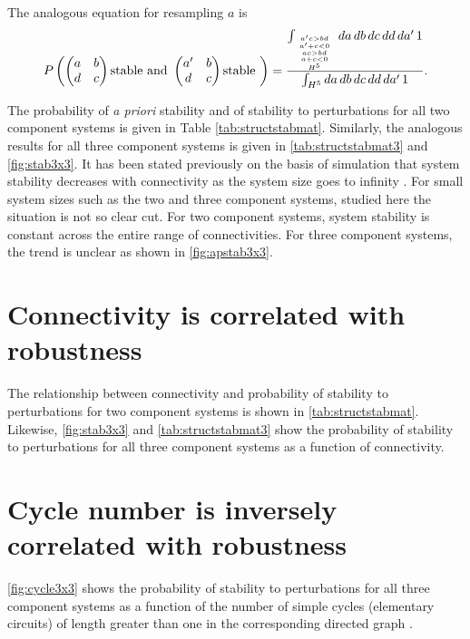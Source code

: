 The analogous equation for resampling $a$ is
\begin{align*}
P\left(\begin{pmatrix}
a & b \\
d & c
\end{pmatrix} \textrm{stable and } \begin{pmatrix}
a' & b \\
d & c
\end{pmatrix} \textrm{stable } \right) = \frac{\int_{{{{a'c>bd \atop a' + c < 0} \atop ac>bd} \atop a+c<0} \atop H^5} da\,db\,dc\,dd\,da'\,1}{\int_{H^5} da\,db\,dc\,dd\,da'\,1}.
\end{align*}

The probability of \emph{a priori} stability and of stability to perturbations for all two component systems is given in Table \ref{tab:structstabmat}. Similarly, the analogous results for all three component systems is given in \ref{tab:structstabmat3} and \ref{fig:stab3x3}. It has been stated previously on the basis of simulation that system stability decreases with connectivity as the system size goes to infinity \cite{May1972}. For small system sizes such as the two and three component systems, studied here the situation is not so clear cut. For two component systems, system stability is constant across the entire range of connectivities. For three component systems, the trend is unclear as shown in \ref{fig:apstab3x3}.


\section{Connectivity is correlated with robustness}
The relationship between connectivity and probability of stability to perturbations for two component systems is shown in \ref{tab:structstabmat}. Likewise, \ref{fig:stab3x3} and \ref{tab:structstabmat3} show the probability of stability to perturbations for all three component systems as a function of connectivity.

\section{Cycle number is inversely correlated with robustness}
\ref{fig:cycle3x3} shows the probability of stability to perturbations for all three component systems as a function of the number of simple cycles (elementary circuits) of length greater than one in the corresponding directed graph \cite{Johnson1975}.


